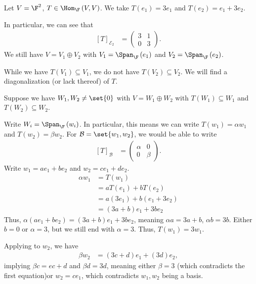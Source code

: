 \documentclass[10pt]{mypackage}
\begin{document}
\begin{example}
  Let $V = \F^2$, $T \in \Hom_{\F}\left(V,V\right)$. We take $T\left(e_1\right) = 3e_1$ and $T\left(e_2\right) = e_1 + 3e_2$.\newline

  In particular, we can see that
  \begin{align*}
    \left[T\right]_{\mathcal{E}_2} &= \begin{pmatrix}3 & 1 \\ 0 & 3\end{pmatrix}.
  \end{align*}
  We still have $V = V_1\oplus V_2$ with $V_1 = \Span_{\F}\left(e_1\right)$ and $V_2 = \Span_{\F}\left(e_2\right)$.\newline

  While we have $T\left(V_1\right)\subseteq V_1$, we do not have $T\left(V_2\right)\subseteq V_2$. We will find a diagonalization (or lack thereof) of $T$.\newline

  Suppose we have $W_1,W_2\neq \set{0}$ with $V = W_1 \oplus W_2$ with $T\left(W_1\right)\subseteq W_1$ and $T\left(W_2\right)\subseteq W_2$.\newline

  Write $W_i = \Span_{\F}\left(w_i\right)$. In particular, this means we can write $T\left(w_1\right) = \alpha w_1$ and $T\left(w_2\right) = \beta w_2$. For $\mathcal{B} = \set{w_1,w_2}$, we would be able to write
  \begin{align*}
    \left[T\right]_{\mathcal{B}} &= \begin{pmatrix}\alpha & 0 \\ 0 & \beta\end{pmatrix}.
  \end{align*}
  Write $w_1 = ae_1 + be_2$ and $w_2 = ce_1 + de_2$.
  \begin{align*}
    \alpha w_1 &= T\left(w_1\right)\\
               &= aT\left(e_1\right) + bT\left(e_2\right)\\
               &= a\left(3e_1\right) + b\left(e_1 + 3e_2\right)\\
               &= \left(3a+b\right)e_1 + 3be_2
  \end{align*}
  Thus, $\alpha\left(ae_1 + be_2\right) = \left(3a+b\right)e_1 + 3be_2$, meaning $\alpha a = 3a + b$, $\alpha b = 3b$. Either $b = 0$ or $\alpha = 3$, but we still end with $\alpha = 3$. Thus, $T\left(w_1\right) = 3w_1$.\newline

  Applying to $w_2$, we have
  \begin{align*}
    \beta w_2 &= \left(3c + d\right)e_1 + \left(3d\right)e_2,
  \end{align*}
  implying $\beta c = ec + d$ and $\beta d = 3d$, meaning either $\beta = 3$ (which contradicts the first equation)or $w_2 = ce_1$, which contradicts $w_1,w_2$ being a basis.
\end{example}
\end{document}
